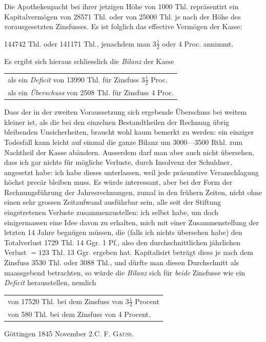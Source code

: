 Die Apothekenpacht bei ihrer jetzigen Höhe von 1000 Thl. repräsentirt ein Kapitalvermögen von 28571 Thl. oder von 25000 Thl. je nach der Höhe des vorausgesetzten Zinsfusses. Es ist folglich das effective Vermögen der Kasse:
\begin{center}
144742 Thl. oder 141171 Thl., jenachdem man \(3\tfrac{1}{2}\) oder 4 Proc. annimmt.
\end{center}
\noindent\hspace*{\parindent}Es ergibt sich hieraus schliesslich die \textit{Bilanz} der Kasse
\begin{center}
\begin{tabular}{l}
als ein \textit{Deficit} von 13990 Thl. für Zinsfuss \(3\tfrac{1}{2}\) Proc.\\
als ein \textit{Überschuss} von 2508 Thl. für Zinsfuss 4 Proc.
\end{tabular}
\end{center}
\noindent\hspace*{\parindent}Dass der in der zweiten Voraussetzung sich ergebende Überschuss bei weitem kleiner ist, als die bei den einzelnen Bestandtheilen der Rechnung übrig bleibenden Unsicherheiten, braucht wohl kaum bemerkt zu werden: ein einziger Todesfall kann leicht auf einmal die ganze Bilanz um 3000—3500 Rthl. zum Nachtheil der Kasse abändern. Ausserdem darf man aber auch nicht übersehen, dass ich gar nichts für mögliche Verluste, durch Insolvenz der Schuldner, angesetzt habe: ich habe dieses unterlassen, weil jede präsumtive Veranschlagung höchst precär bleiben muss. Es würde interessant, aber bei der Form der Rechnungsführung der Jahresrechnungen, zumal in den frühern Zeiten, nicht ohne einen sehr grossen Zeitaufwand ausführbar sein, alle seit der Stiftung eingetretenen Verluste zusammenzustellen: ich selbst habe, um doch einigermassen eine Idee davon zu erhalten, mich mit einer Zusammenstellung der letzten 14 Jahre begnügen müssen, die (falls ich nichts übersehen habe) den Totalverlust 1729 Thl. 14 Ggr. 1 Pf., also den durchschnittlichen jährlichen Verlust \(=123\) Thl. 13 Ggr. ergeben hat. Kapitalisirt beträgt diess je nach dem Zinsfuss 3530 Thl. oder 3088 Thl., und dürfte man diesen Durchschnitt als maassgebend betrachten, so würde die \textit{Bilanz} sich für \textit{beide} Zinsfusse wie ein \textit{Deficit} herausstellen, nemlich
\begin{center}
\begin{tabular}{l}
von 17520 Thl. bei dem Zinsfuss von \(3\tfrac{1}{2}\) Procent\\
von\phantom{ 17} 580 Thl. bei dem Zinsfuss von 4 Procent.
\end{tabular}
\end{center}
\noindent Göttingen 1845 November 2.\hfill C. F. \textsc{Gauss}.
